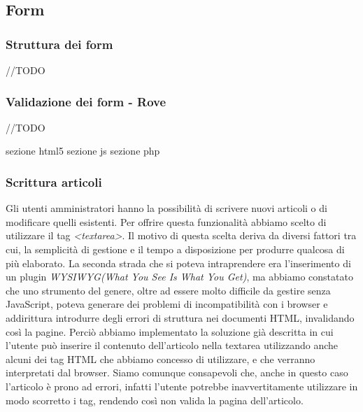 \documentclass[12pt]{article}
\begin{document}
	\subsection{Form}
	\subsubsection{Struttura dei form}
	//TODO
	\subsubsection{Validazione dei form - Rove}
	//TODO	
	
	sezione html5
	sezione js
	sezione php
	\subsubsection{Scrittura articoli}
	Gli utenti amministratori hanno la possibilità di scrivere nuovi articoli o di modificare quelli esistenti. Per offrire questa funzionalità abbiamo scelto di utilizzare il tag \emph{<textarea>}. Il motivo di questa scelta deriva da diversi fattori tra cui, la semplicità di gestione e il tempo a disposizione per produrre qualcosa di più elaborato. La seconda strada che si poteva intraprendere era l'inserimento di un plugin \emph{WYSIWYG(What You See Is What You Get)}, ma abbiamo constatato che uno strumento del genere, oltre ad essere molto difficile da gestire senza JavaScript, poteva generare dei problemi di incompatibilità con i browser e addirittura introdurre degli errori di struttura nei documenti HTML, invalidando così la pagine. Perciò abbiamo implementato la soluzione già descritta in cui l'utente può inserire il contenuto dell'articolo nella textarea utilizzando anche alcuni dei tag HTML che abbiamo concesso di utilizzare, e che verranno interpretati dal browser. Siamo comunque consapevoli che, anche in questo caso l'articolo è prono ad errori, infatti l'utente potrebbe inavvertitamente utilizzare in modo scorretto i tag, rendendo così non valida la pagina dell'articolo.
\end{document}
